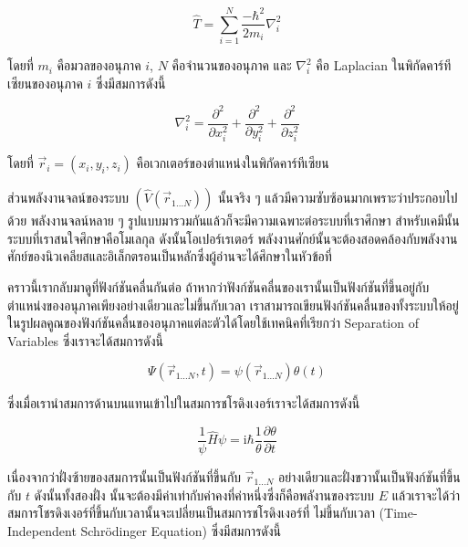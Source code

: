 \begin{equation}
  \label{eq:kinetic_operator}
  \hat{T} = \sum_{i=1}^N \frac{-\hbar^2}{2 m_i} \nabla_i^2
\end{equation}

\noindent โดยที่ $m_i$ คือมวลของอนุภาค $i$, $N$ คือจำนวนของอนุภาค และ $\nabla_i^2$ คือ Laplacian ในพิกัดคาร์ทีเซียนของอนุภาค
$i$ ซึ่งมีสมการดังนี้

\begin{equation}
  \label{eq:nabla}
  \nabla_i^2
  =
  \frac{\partial^2}{\partial x_i^2}
  + \frac{\partial^2}{\partial y_i^2}
  + \frac{\partial^2}{\partial z_i^2}
\end{equation}

\noindent โดยที่ $\vec{r}_i = \left(x_i, y_i, z_i\right)$ คือเวกเตอร์ของตำแหน่งในพิกัดคาร์ทีเซียน

ส่วนพลังงานจลน์ของระบบ $(\hat{V}\left(\vec{r}_{1 \ldots N}\right))$ นั้นจริง ๆ แล้วมีความซับซ้อนมากเพราะว่าประกอบไปด้วย%
พลังงานจลน์หลาย ๆ รูปแบบมารวมกันแล้วก็จะมีความเฉพาะต่อระบบที่เราศึกษา สำหรับเคมีนั้นระบบที่เราสนใจศึกษาคือโมเลกุล ดังนั้นโอเปอร์เรเตอร์%
พลังงานศักย์นั้นจะต้องสอดคล้องกับพลังงานศักย์ของนิวเคลียสและอิเล็กตรอนเป็นหลักซึ่งผู้อ่านจะได้ศึกษาในหัวข้อที่

คราวนี้เรากลับมาดูที่ฟังก์ชันคลื่นกันต่อ ถ้าหากว่าฟังก์ชันคลื่นของเรานั้นเป็นฟังก์ชันที่ขึ้นอยู่กับตำแหน่งของอนุภาคเพียงอย่างเดียวและไม่ขึ้นกับเวลา
เราสามารถเขียนฟังก์ชันคลื่นของทั้งระบบให้อยู่ในรูปผลคูณของฟังก์ชันคลื่นของอนุภาคแต่ละตัวได้โดยใช้เทคนิคที่เรียกว่า Separation of Variables
ซึ่งเราจะได้สมการดังนี้

\begin{equation}
  \Psi\left(\vec{r}_{1 \ldots N}, t\right)
  =
  \psi\left(\vec{r}_{1 \ldots N}\right) \theta(t)
\end{equation}

\noindent ซึ่งเมื่อเรานำสมการด้านบนแทนเข้าไปในสมการชโรดิงเงอร์เราจะได้สมการดังนี้

\begin{equation}
  \frac{1}{\psi} \hat{H} \psi
  =
  \mathrm{i} \hbar
  \frac{1}{\theta}
  \frac{\partial \theta}{\partial t}
\end{equation}

เนื่องจากว่าฝั่งซ้ายของสมการนั้นเป็นฟังก์ชันที่ขึ้นกับ $\vec{r}_{1 . . . N}$ อย่างเดียวและฝั่งขวานั้นเป็นฟังก์ชันที่ขึ้นกับ $t$ ดังนั้นทั้งสองฝั่ง%
นั้นจะต้องมีค่าเท่ากับค่าคงที่ค่าหนึ่งซึ่งก็คือพลังานของระบบ $E$ แล้วเราจะได้ว่าสมการโชรดิงเงอร์ที่ขึ้นกับเวลานั้นจะเปลี่ยนเป็นสมการชโรดิงเงอร์ที่%
ไม่ขึ้นกับเวลา (Time-Independent Schr\"{o}dinger Equation) ซึ่งมีสมการดังนี้

